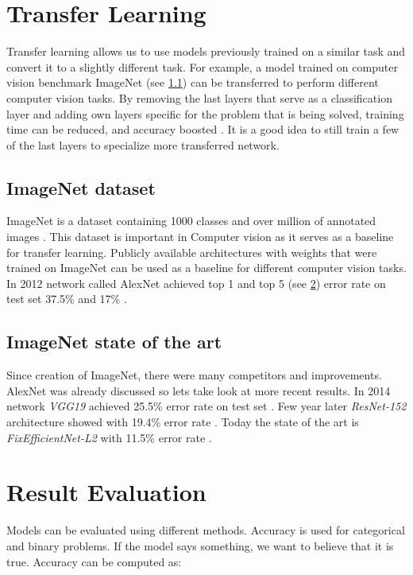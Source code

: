 \documentclass[thesis=B,english]{FITthesis}[2019/12/23]
\begin{document}
\section{Transfer Learning}
    Transfer learning allows us to use models previously trained on a similar task and convert it to a slightly different task. For example, a model trained on computer vision benchmark ImageNet (see \ref{sub:imagenet}) can be transferred to perform different computer vision tasks. By removing the last layers that serve as a classification layer and adding own layers specific for the problem that is being solved, training time can be reduced, and accuracy boosted \cite{bengio2017deep}. It is a good idea to still train a few of the last layers to specialize more transferred network.

\subsection{ImageNet dataset}\label{sub:imagenet}
    ImageNet is a dataset containing 1000 classes and over million of annotated images \cite{imagenet_stats}. This dataset is important in Computer vision as it serves as a baseline for transfer learning. Publicly available architectures with weights that were trained on ImageNet can be used as a baseline for different computer vision tasks. In 2012 network called AlexNet achieved top 1 and top 5 (see \ref{sub:topkek}) error rate on test set 37.5\% and 17\% \cite{alexnet}.
    
\subsection{ImageNet state of the art}
    Since creation of ImageNet, there were many competitors and improvements. AlexNet was already discussed so lets take look at more recent results. In 2014 network \emph{VGG19} achieved 25.5\% error rate on test set \cite{vgg}. Few year later \emph{ResNet-152} architecture showed with 19.4\% error rate \cite{resnet152}. Today the state of the art is \emph{FixEfficientNet-L2} with 11.5\% error rate \cite{fixefficientnet}.  

\section{Result Evaluation}\label{sub:topkek}
Models can be evaluated using different methods. Accuracy is used for categorical and binary problems. If the model says something, we want to believe that it is true. Accuracy can be computed as:
\end{document}
